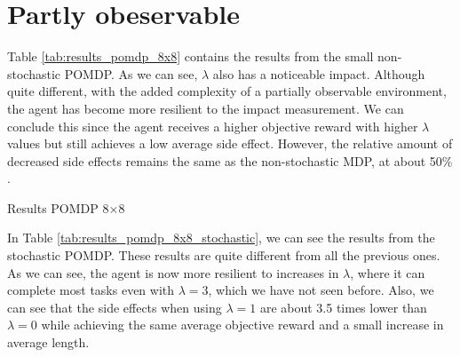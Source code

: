 \documentclass[12pt,A4]{report}
\theoremstyle{definition}
\begin{document}
\section{Partly obeservable}
Table \ref{tab:results_pomdp_8x8} contains the results from the small non-stochastic POMDP. As we can see, $\lambda$ also has a noticeable impact. Although quite different, with the added complexity of a partially observable environment, the agent has become more resilient to the impact measurement. We can conclude this since the agent receives a higher objective reward with higher $\lambda$ values but still achieves a low average side effect. However, the relative amount of decreased side effects remains the same as the non-stochastic MDP, at about 50$\%$.




\begin{table}[H]
  \centering
  \caption{Results POMDP 8$\times$8}
  
  \label{tab:results_pomdp_8x8}
\end{table}

In Table \ref{tab:results_pomdp_8x8_stochastic}, we can see the results from the stochastic POMDP. These results are quite different from all the previous ones. As we can see, the agent is now more resilient to increases in $\lambda$, where it can complete most tasks even with $\lambda=3$, which we have not seen before. Also, we can see that the side effects when using $\lambda = 1$ are about 3.5 times lower than $\lambda=0$ while achieving the same average objective reward and a small increase in average length. 
\end{document}
